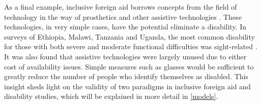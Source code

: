 \documentclass[a4paper]{article}
\begin{document}
As a final example, inclusive foreign aid borrows concepts from the field of
technology in the way of prosthetics and other assistive technologies
\citep{roulstone2016disability}. These technologies, in very simple cases,
have the potential eliminate a disability. In surveys of Ethiopia, Malawi,
Tanzania and Uganda, the most common disability for those with both severe and
moderate functional difficulties was sight-related
\citep{mitra2018disability}. It was also found that assistive technologies
were largely unused due to either cost of availability issues. Simple measures
such as glasses would be sufficient to greatly reduce the number of people who
identify themselves as disabled. This insight sheds light on the validity of
two paradigms in inclusive foreign aid and disability studies, which will be
explained in more detail in \autoref{models}.



\end{document}
